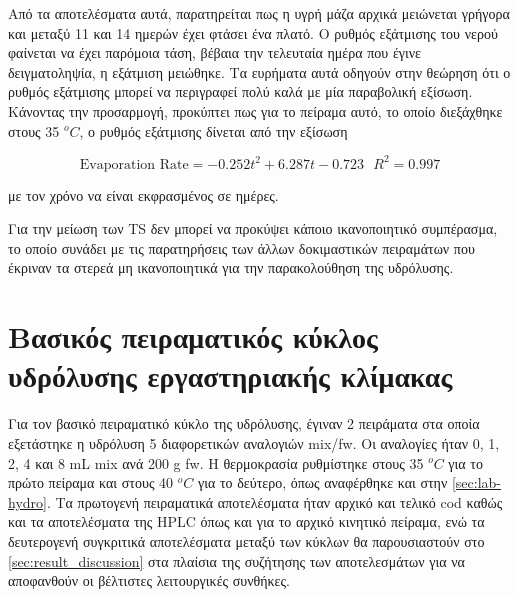 \documentclass[11pt]{report}
\begin{document}
\begin{enumerate}
Από τα αποτελέσματα αυτά, παρατηρείται πως η υγρή μάζα αρχικά μειώνεται γρήγορα και μεταξύ 11 και 14 ημερών έχει φτάσει ένα πλατό. Ο ρυθμός εξάτμισης του νερού φαίνεται να έχει παρόμοια τάση, βέβαια την τελευταία ημέρα που έγινε δειγματοληψία, η εξάτμιση μειώθηκε. Τα ευρήματα αυτά οδηγούν στην θεώρηση ότι ο ρυθμός εξάτμισης μπορεί να περιγραφεί πολύ καλά με μία παραβολική εξίσωση. Κάνοντας την προσαρμογή, προκύπτει πως για το πείραμα αυτό, το οποίο διεξάχθηκε στους 35 \(^oC\), ο ρυθμός εξάτμισης δίνεται από την εξίσωση

\[ \text{Evaporation Rate} = -0.252t^2 + 6.287t - 0.723 ~ ~ ~ R^2 = 0.997 \]

με τον χρόνο να είναι εκφρασμένος σε ημέρες.

Για την μείωση των TS δεν μπορεί να προκύψει κάποιο ικανοποιητικό συμπέρασμα, το οποίο συνάδει με τις παρατηρήσεις των άλλων δοκιμαστικών πειραμάτων που έκριναν τα στερεά μη ικανοποιητικά για την παρακολούθηση της υδρόλυσης.
\end{enumerate}

\section{Βασικός πειραματικός κύκλος υδρόλυσης εργαστηριακής κλίμακας}
\label{sec:org0cf19b0}
Για τον βασικό πειραματικό κύκλο της υδρόλυσης, έγιναν 2 πειράματα στα οποία εξετάστηκε η υδρόλυση 5 διαφορετικών αναλογιών \acrshort{mix}/\acrshort{fw}. Οι αναλογίες ήταν 0, 1, 2, 4 και 8 mL \acrshort{mix} ανά 200 g \acrshort{fw}. Η θερμοκρασία ρυθμίστηκε στους 35 \(^oC\) για το πρώτο πείραμα και στους 40 \(^oC\) για το δεύτερο, όπως αναφέρθηκε και στην \autoref{sec:lab-hydro}. Τα πρωτογενή πειραματικά αποτελέσματα ήταν αρχικό και τελικό \acrshort{cod} καθώς και τα αποτελέσματα της HPLC όπως και για το αρχικό κινητικό πείραμα, ενώ τα δευτερογενή συγκριτικά αποτελέσματα μεταξύ των κύκλων θα παρουσιαστούν στο \autoref{sec:result_discussion} στα πλαίσια της συζήτησης των αποτελεσμάτων για να αποφανθούν οι βέλτιστες λειτουργικές συνθήκες.
\end{document}
